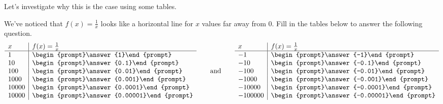 \documentclass{ximera}
\begin{document}
Let's investigate why this is the case using some tables.

\begin{problem}
We've noticed that $f(x) = \frac{1}{x}$ looks like a horizontal line for $x$ values far away from $0$.  Fill in the tables below to answer the following question. 
  \[
  \begin{array}{l|l}
    x      & f(x) = \frac{1}{x}     \\ \hline
    1    & \begin{prompt}\answer{1}\end{prompt}\\
    10   & \begin{prompt}\answer{0.1}\end{prompt}\\
    100  & \begin{prompt}\answer{0.01}\end{prompt}\\
    1000 & \begin{prompt}\answer{0.001}\end{prompt} \\
    10000 & \begin{prompt}\answer{0.0001}\end{prompt} \\
    10000 & \begin{prompt}\answer{0.00001}\end{prompt} \\
  \end{array}
  \qquad\text{and}\qquad
  \begin{array}{l|l}
     x      & f(x) = \frac{1}{x}     \\ \hline
    -1    & \begin{prompt}\answer{-1}\end{prompt}\\
    -10   & \begin{prompt}\answer{-0.1}\end{prompt}\\
    -100  & \begin{prompt}\answer{-0.01}\end{prompt}\\
    -1000 & \begin{prompt}\answer{-0.001}\end{prompt} \\
    -10000 & \begin{prompt}\answer{-0.0001}\end{prompt} \\
    -100000 & \begin{prompt}\answer{-0.00001}\end{prompt} \\
    \end{array}
  \]
  

\end{problem}
\end{document}
